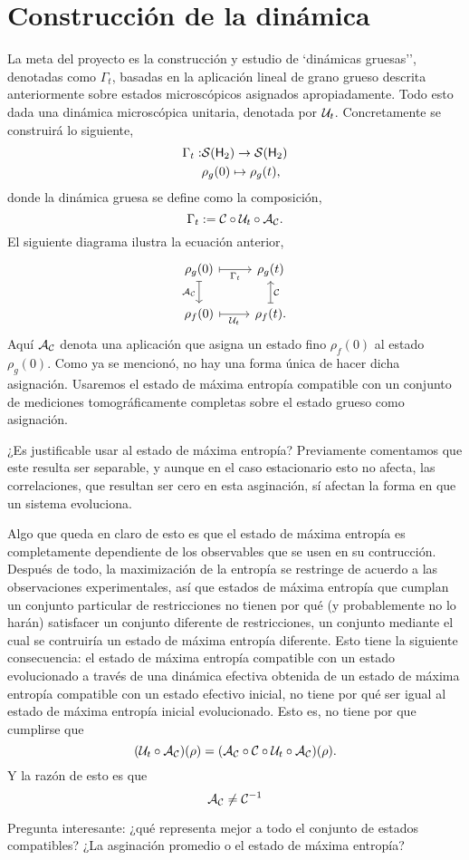 \section{Construcción de la dinámica}

La meta del proyecto es la construcción y estudio de `dinámicas gruesas'', denotadas como $\Gamma_t$, basadas en la aplicación lineal de grano grueso descrita anteriormente sobre estados microscópicos asignados apropiadamente. Todo esto dada una dinámica microscópica unitaria, denotada por $\mathcal{U}_t$. Concretamente se construirá lo siguiente,
\begin{align*}
\Gamma_{t}:&\mathcal{S}({\sf H}_2)\rightarrow \mathcal{S}({\sf H}_2)\\
&\rho_g(0) \mapsto \rho_g(t),
\end{align*}
donde la dinámica gruesa se define como la composición,
\begin{equation*}
\Gamma_t:=\mathcal{C} \circ \mathcal{U}_t \circ \mathcal{A}_{\mathcal{C}}.
\end{equation*}
El siguiente diagrama ilustra la ecuación anterior,
\[\begin{tikzcd}[arrows={<-|}]
\rho_{g}(0)  & \rho_{g}(t) \arrow{l}{\Gamma_{t}} \arrow{d}{\mcC}\\
\rho_{f}(0) \arrow{u}{\mcA_{\mcC}} & \rho_{f}(t). \arrow{l}{\mcU_{t}}
\end{tikzcd}
\]
Aquí $\mathcal{A}_{\mathcal{C}}$ denota una aplicación que asigna un estado fino $\rho_f(0)$ al estado $\rho_g(0)$. Como ya se mencionó, no hay una forma única de hacer dicha asignación. Usaremos el estado de máxima entropía compatible con un conjunto de mediciones tomográficamente completas sobre el estado grueso como asignación.

¿Es justificable usar al estado de máxima entropía? Previamente comentamos que este resulta ser separable, y aunque en el caso estacionario esto no afecta, las correlaciones, que resultan ser cero en esta asginación, sí afectan la forma en que un sistema evoluciona.

Algo que queda en claro de esto es que el estado de máxima entropía es completamente dependiente de los observables que se usen en su contrucción. Después de todo, la maximización de la entropía se restringe de acuerdo a las observaciones experimentales, así que estados de máxima entropía que cumplan un conjunto particular de restricciones no tienen por qué (y probablemente no lo harán) satisfacer un conjunto diferente de restricciones, un conjunto mediante el cual se contruiría un estado de máxima entropía diferente. Esto tiene la siguiente consecuencia: el estado de máxima entropía compatible con un estado evolucionado a través de una dinámica efectiva obtenida de un estado de máxima entropía compatible con un estado efectivo inicial, no tiene por qué ser igual al estado de máxima entropía inicial evolucionado. Esto es, no tiene por que cumplirse que
\begin{equation*}
    (\mathcal{U}_{t}\circ\mathcal{A}_{\mathcal{C}})(\rho) = (\mathcal{A}_{\mathcal{C}}\circ\mathcal{C} \circ \mathcal{U}_t \circ \mathcal{A}_{\mathcal{C}})(\rho).
\end{equation*}
Y la razón de esto es que
\begin{equation*}
    \mathcal{A}_{\mathcal{C}}\neq\mathcal{C}^{-1}
\end{equation*}

Pregunta interesante: ¿qué representa mejor a todo el conjunto de estados compatibles? ¿La asginación promedio o el estado de máxima entropía?


